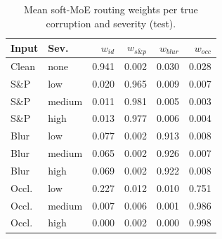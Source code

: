 \begin{table}[t]\centering\caption{Mean soft-MoE routing weights per true corruption and severity (test).}\label{tab:t3w}\setlength{\tabcolsep}{4pt}
\begin{tabular}{llrrrr}\toprule
Input & Sev. & $w_{id}$ & $w_{s\&p}$ & $w_{blur}$ & $w_{occ}$\\ \midrule
Clean & none & 0.941 & 0.002 & 0.030 & 0.028 \\
S\&P & low & 0.020 & 0.965 & 0.009 & 0.007 \\
S\&P & medium & 0.011 & 0.981 & 0.005 & 0.003 \\
S\&P & high & 0.013 & 0.977 & 0.006 & 0.004 \\
Blur & low & 0.077 & 0.002 & 0.913 & 0.008 \\
Blur & medium & 0.065 & 0.002 & 0.926 & 0.007 \\
Blur & high & 0.069 & 0.002 & 0.922 & 0.008 \\
Occl. & low & 0.227 & 0.012 & 0.010 & 0.751 \\
Occl. & medium & 0.007 & 0.006 & 0.001 & 0.986 \\
Occl. & high & 0.000 & 0.002 & 0.000 & 0.998 \\
\bottomrule\end{tabular}\end{table}
